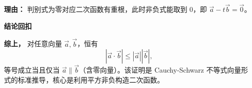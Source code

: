 \begin{proofbox}
\begin{description}[style=nextline, leftmargin=2.8em, labelsep=0.5em, itemsep=0.55em]
		      \par\textbf{理由：} 判别式为零对应二次函数有重根，此时非负式能取到 $0$，即 $\vec{a}-t\vec{b}=\vec{0}$。
	\end{description}

	\medskip
	\textbf{\textcolor{CProof}{结论回扣}}

	\textbf{综上，} 对任意向量 $\vec{a},\vec{b}$，恒有
	\[
		|\vec{a}\cdot\vec{b}| \le |\vec{a}||\vec{b}|,
	\]
	等号成立当且仅当 $\vec{a} \parallel \vec{b}$（含零向量）。该证明是 Cauchy-Schwarz 不等式向量形式的标准推导，核心是利用平方非负构造二次函数。
\end{proofbox}